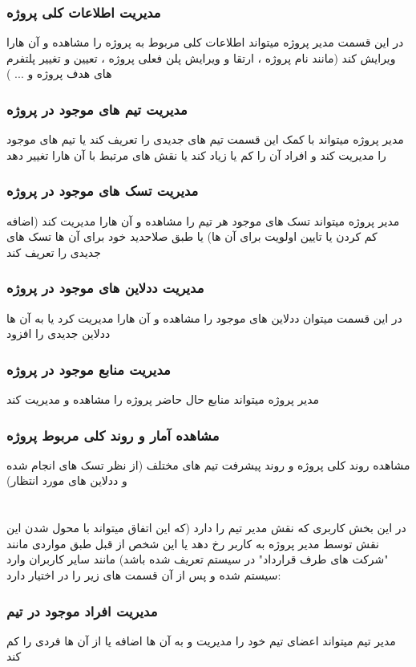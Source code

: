 \documentclass[10pt,a4paper]{article}
\begin{document}
\section*{
مدیریت اطلاعات کلی پروژه
}
در این قسمت مدیر پروژه میتواند اطلاعات کلی مربوط به پروژه را مشاهده و آن هارا ویرایش کند (مانند نام پروژه ، ارتقا و ویرایش پلن فعلی پروژه ، تعیین و تغییر پلتفرم های هدف پروژه و ... )

\section*{
	مدیریت تیم های موجود در پروژه
}
مدیر پروژه میتواند با کمک این قسمت تیم های جدیدی را تعریف کند یا تیم های موجود را مدیریت کند و افراد آن را کم یا زیاد کند یا نقش های مرتبط با آن هارا تغییر دهد
\section*{
	مدیریت تسک های موجود در پروژه
}
مدیر پروژه میتواند تسک های موجود هر تیم را مشاهده و آن هارا مدیریت کند (اضافه کم کردن یا تایین اولویت برای آن ها) یا طبق صلاحدید خود برای آن ها تسک های جدیدی را تعریف کند
\section*{
	مدیریت ددلاین های موجود در پروژه
}
در این قسمت میتوان ددلاین های موجود را مشاهده و آن هارا مدیریت کرد یا به آن ها ددلاین جدیدی را افزود
\section*{
مدیریت منابع موجود در پروژه
}
مدیر پروژه میتواند منابع حال حاضر پروژه را مشاهده و مدیریت کند
\section*{
مشاهده آمار و روند کلی مربوط پروژه
}
مشاهده روند کلی پروژه و روند پیشرفت تیم های مختلف (از نظر تسک های انجام شده و ددلاین های مورد انتظار)
\part{
}
در این بخش کاربری که نقش مدیر تیم را دارد (که این اتفاق میتواند با محول شدن این نقش توسط مدیر پروژه به کاربر رخ دهد یا این شخص از قبل طبق مواردی مانند "شرکت های طرف قرارداد" در سیستم تعریف شده باشد) مانند سایر کاربران وارد سیستم شده و پس از آن قسمت های زیر را در اختیار دارد:
\section*{
	مدیریت افراد موجود در تیم
}
مدیر تیم میتواند اعضای تیم خود را مدیریت و به آن ها اضافه یا از آن ها فردی را کم کند
\end{document}

